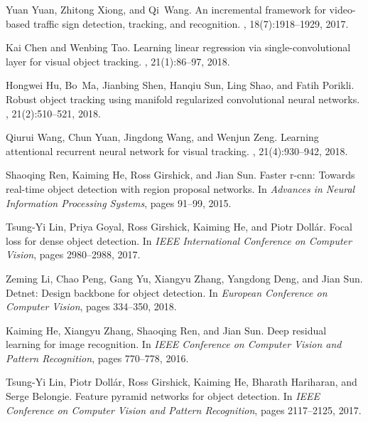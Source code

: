 \documentclass[journal]{IEEEtran}
\begin{document}
\begin{thebibliography}{10}
	Yuan Yuan, Zhitong Xiong, and Qi~Wang.
	\newblock An incremental framework for video-based traffic sign detection,
	tracking, and recognition.
	,
	18(7):1918--1929, 2017.
	
	Kai Chen and Wenbing Tao.
	\newblock Learning linear regression via single-convolutional layer for visual
	object tracking.
	, 21(1):86--97, 2018.
	
	Hongwei Hu, Bo~Ma, Jianbing Shen, Hanqiu Sun, Ling Shao, and Fatih Porikli.
	\newblock Robust object tracking using manifold regularized convolutional
	neural networks.
	, 21(2):510--521, 2018.
	
	Qiurui Wang, Chun Yuan, Jingdong Wang, and Wenjun Zeng.
	\newblock Learning attentional recurrent neural network for visual tracking.
	, 21(4):930--942, 2018.
	
	Shaoqing Ren, Kaiming He, Ross Girshick, and Jian Sun.
	\newblock Faster r-cnn: Towards real-time object detection with region proposal
	networks.
	\newblock In {\em Advances in Neural Information Processing Systems}, pages
	91--99, 2015.
	
	Tsung-Yi Lin, Priya Goyal, Ross Girshick, Kaiming He, and Piotr Doll{\'a}r.
	\newblock Focal loss for dense object detection.
	\newblock In {\em IEEE International Conference on Computer Vision}, pages
	2980--2988, 2017.
	
	Zeming Li, Chao Peng, Gang Yu, Xiangyu Zhang, Yangdong Deng, and Jian Sun.
	\newblock Detnet: Design backbone for object detection.
	\newblock In {\em European Conference on Computer Vision}, pages 334--350,
	2018.
	
	Kaiming He, Xiangyu Zhang, Shaoqing Ren, and Jian Sun.
	\newblock Deep residual learning for image recognition.
	\newblock In {\em IEEE Conference on Computer Vision and Pattern Recognition},
	pages 770--778, 2016.
	
	Tsung-Yi Lin, Piotr Doll{\'a}r, Ross Girshick, Kaiming He, Bharath Hariharan,
	and Serge Belongie.
	\newblock Feature pyramid networks for object detection.
	\newblock In {\em IEEE Conference on Computer Vision and Pattern Recognition},
	pages 2117--2125, 2017.
	

\end{thebibliography}
\end{document}

